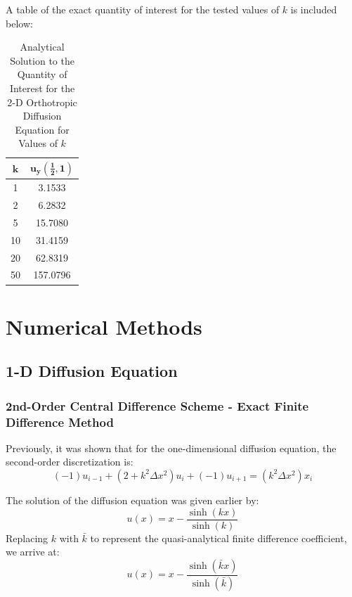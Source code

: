 \documentclass[10pt]{article}		%
\numberwithin{equation}{section}
\begin{document}
A table of the exact quantity of interest for the tested values of $k$ is included below:
\begin{table}[H]
	\caption{Analytical Solution to the Quantity of Interest for the 2-D Orthotropic Diffusion Equation for Values of $k$}
	\begin{tabular}{|c|c|}
		\hline 
		$\mathbf{k}$ & $\mathbf{u_y(\tfrac{1}{2}, 1)}$ \\ 
		\hline 
		1 & 3.1533 \\ 
		\hline 
		2 & 6.2832 \\ 
		\hline 
		5 & 15.7080 \\ 
		\hline 
		10 & 31.4159 \\ 
		\hline 
		20 & 62.8319 \\ 
		\hline 
		50 & 157.0796 \\ 
		\hline 
	\end{tabular}
\end{table} 

\newpage

\section{Numerical Methods}

\subsection{1-D Diffusion Equation}

\subsubsection{2nd-Order Central Difference Scheme - Exact Finite Difference Method}

Previously, it was shown that for the one-dimensional diffusion equation, the second-order discretization is:
\begin{equation}
\left(-1\right) u_{i-1} + \left(2 + k^2\Delta x^2\right) u_{i} + \left(-1\right) u_{i+1} = \left(k^2\Delta x^2 \right)x_i
\end{equation}

The solution of the diffusion equation was given earlier by:
\begin{equation}
u(x) = x - \frac{\sinh(kx)}{\sinh(k)}
\end{equation}
Replacing $k$ with $\bar{k}$ to represent the quasi-analytical finite difference coefficient, we arrive at:
\begin{equation}
u(x) = x - \frac{\sinh(\bar{k}x)}{\sinh(\bar{k})}
\end{equation}
\end{document}

